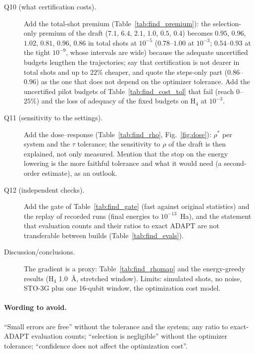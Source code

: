 \documentclass[11pt]{article}
\begin{document}
\begin{description}
  \item[Q10 (what certification costs).] Add the total-shot premium (Table~\ref{tab:find_premium}): the selection-only premium of the draft ($7.1$, $6.4$, $2.1$, $1.0$, $0.5$, $0.4$) becomes $0.95$, $0.96$, $1.02$, $0.81$, $0.96$, $0.86$ in total shots at $10^{-5}$ ($0.78$--$1.00$ at $10^{-3}$; $0.54$--$0.93$ at the tight $10^{-9}$, whose intervals are wide) because the adequate uncertified budgets lengthen the trajectories; say that certification is not dearer in total shots and up to $22\%$ cheaper, and quote the steps-only part ($0.86$--$0.96$) as the one that does not depend on the optimizer tolerance. Add the uncertified pilot budgets of Table~\ref{tab:find_cost_tol} that fail (reach $0$--$25\%$) and the loss of adequacy of the fixed budgets on H$_4$ at $10^{-3}$.
  \item[Q11 (sensitivity to the settings).] Add the dose--response (Table~\ref{tab:find_rho}, Fig.~\ref{fig:dose}): $\rho^\ast$ per system and the $\tau$ tolerance; the sensitivity to $\rho$ of the draft is then explained, not only measured. Mention that the stop on the energy lowering is the more faithful tolerance and what it would need (a second-order estimate), as an outlook.
  \item[Q12 (independent checks).] Add the gate of Table~\ref{tab:find_gate} (fast against original statistics) and the replay of recorded runs (final energies to $10^{-13}$~Ha), and the statement that evaluation counts and their ratios to exact ADAPT are not transferable between builds (Table~\ref{tab:find_evals}).
  \item[Discussion/conclusions.] The gradient is a proxy: Table~\ref{tab:find_rhomap} and the energy-greedy results (H$_4$ 1.0~\AA, stretched window). Limits: simulated shots, no noise, STO-3G plus one 16-qubit window, the optimization cost model.
\end{description}

\paragraph{Wording to avoid.} ``Small errors are free'' without the tolerance and the system; any ratio to exact-ADAPT evaluation counts; ``selection is negligible'' without the optimizer tolerance; ``confidence does not affect the optimization cost''.

\end{document}
